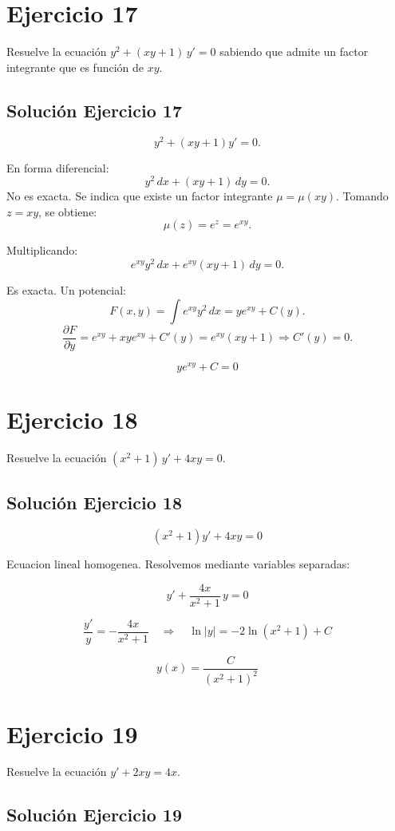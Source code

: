 \documentclass[12pt]{article}
\begin{document}
\section*{Ejercicio 17}
Resuelve la ecuación $y^2 + (xy + 1)\,y' = 0$ sabiendo que admite un factor integrante que es función de $xy$.

\subsection*{Solución Ejercicio 17}

\[
y^2+(xy+1)y'=0.
\]

En forma diferencial:
\[
y^2\,dx+(xy+1)\,dy=0.
\]
No es exacta. Se indica que existe un factor integrante \(\mu=\mu(xy)\).
Tomando \(z=xy\), se obtiene:
\[
\boxed{\mu(z)=e^{z}=e^{xy}}.
\]

Multiplicando:
\[
e^{xy}y^2\,dx+e^{xy}(xy+1)\,dy=0.
\]

Es exacta. Un potencial:
\[
F(x,y)=\int e^{xy}y^2\,dx=ye^{xy}+C(y).
\]
\[
\frac{\partial F}{\partial y}=e^{xy}+xye^{xy}+C'(y)=e^{xy}(xy+1)
\Rightarrow C'(y)=0.
\]

\[
\boxed{\,y e^{xy}+C=0\,}
\]

\section*{Ejercicio 18}
Resuelve la ecuación $(x^2 + 1)\,y' + 4xy = 0$.

\subsection*{Solución Ejercicio 18}

\[
(x^2+1)y' + 4xy = 0
\]

Ecuacion lineal homogenea. Resolvemos mediante variables separadas:

\[
y' + \frac{4x}{x^2+1}\,y = 0
\]

\[
\frac{y'}{y} = -\frac{4x}{x^2+1}
\quad\Rightarrow\quad
\ln|y| = -2\ln(x^2+1) + C
\]

\[
\boxed{y(x) = \frac{C}{(x^2+1)^2}}
\]

\section*{Ejercicio 19}
Resuelve la ecuación $y' + 2xy = 4x$.

\subsection*{Solución Ejercicio 19}
\end{document}
